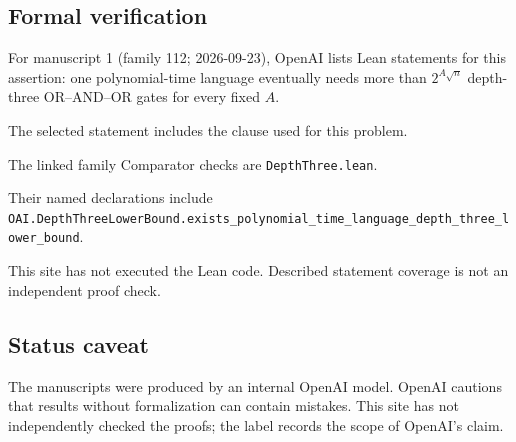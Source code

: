 \documentclass[11pt]{article}
\begin{document}
\subsection{Formal verification}
For manuscript 1 (family 112; 2026-09-23), OpenAI lists Lean statements for this assertion: one polynomial-time language eventually needs more than $2^{A\sqrt n}$ depth-three OR--AND--OR gates for every fixed $A$.

The selected statement includes the clause used for this problem.

The linked family Comparator checks are \texttt{DepthThree.lean}.

Their named declarations include \texttt{OAI.DepthThreeLowerBound.exists\_polynomial\_time\_language\_depth\_three\_lower\_bound}.

This site has not executed the Lean code. Described statement coverage is not an independent proof check.

\subsection{Status caveat}
The manuscripts were produced by an internal OpenAI model. OpenAI cautions that results without formalization can contain mistakes. This site has not independently checked the proofs; the label records the scope of OpenAI's claim.
\end{document}
